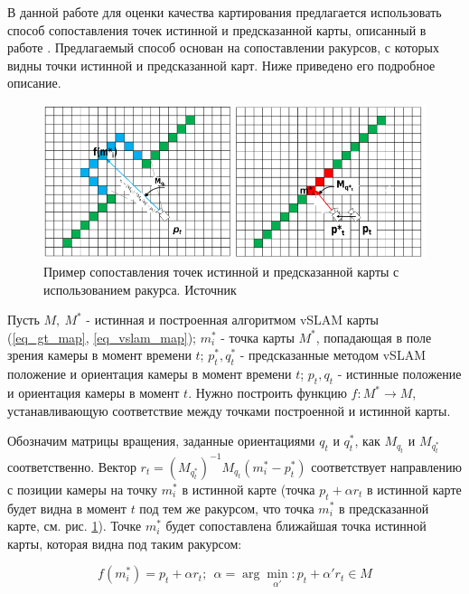 \documentclass{mipt-thesis-ms}
\begin{document}
	В данной работе для оценки качества картирования предлагается использовать способ сопоставления точек истинной и предсказанной карты, описанный в работе \cite{bokovoy2021assessment}. Предлагаемый способ основан на сопоставлении ракурсов, с которых видны точки истинной и предсказанной карт. Ниже приведено его подробное описание.
	
	\begin{figure}
		\includegraphics[width=1.0\textwidth]{img/corresp.png}
		\caption{Пример сопоставления точек истинной и предсказанной карты с использованием ракурса. Источник \cite{bokovoy2021assessment}}
		\label{figure_correspondences}
	\end{figure}
	
	Пусть $M,\ M^*$ - истинная и построенная алгоритмом vSLAM карты (\ref{eq_gt_map}, \ref{eq_vslam_map}); $m_i^*$ - точка карты $M^*$, попадающая в поле зрения камеры в момент времени $t$; $p_t^*, q_t^*$ - предсказанные методом vSLAM положение и ориентация камеры в момент времени $t$; $p_t, q_t$ - истинные положение и ориентация камеры в момент $t$. Нужно построить функцию $f: M^* \longrightarrow M$, устанавливающую соответствие между точками построенной и истинной карты.
	
	Обозначим матрицы вращения, заданные ориентациями $q_t$ и $q_t^*$, как $M_{q_t}$ и $M_{q_t^*}$ соответственно. Вектор $r_t = (M_{q_t^*})^{-1} M_{q_t} (m_i^* - p_t^*)$ соответствует направлению с позиции камеры на точку $m_i^*$ в истинной карте (точка $p_t + \alpha r_t$ в истинной карте будет видна в момент $t$ под тем же ракурсом, что точка $m_i^*$ в предсказанной карте, см. рис. \ref{figure_correspondences}). Точке $m_i^*$ будет сопоставлена ближайшая точка истинной карты, которая видна под таким ракурсом:
	
	\begin{equation}
	\label{eq_corresp_function}
	f(m_i^*) = p_t + \alpha r_t;\ \ \alpha = \arg\min \limits_{\alpha'}: p_t + \alpha' r_t \in M
	\end{equation}
\end{document}
